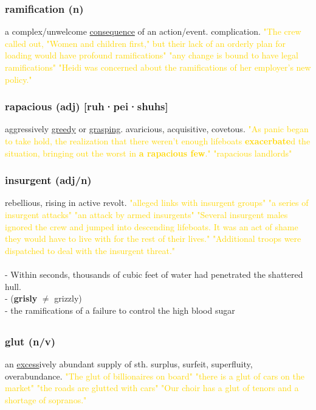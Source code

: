 \documentclass{proc}
\begin{document}
	\subsubsection{\textcolor{brickred}{ramification} (n)}
	a complex/unwelcome \underline{consequence} of an action/event. complication.
	\textcolor{gold}{"The crew called out, "Women and children first," but their lack of an orderly plan for loading would have profound ramifications" "any change is bound to have legal ramifications" "Heidi was concerned about the ramifications of her employer's new policy."}
	
	\subsubsection{\textcolor{brickred}{rapacious} (adj) [ruh·pei·shuhs]}
	aggressively \underline{greedy} or \underline{grasping}. avaricious, acquisitive, covetous.
	\textcolor{gold}{"As panic began to take hold, the realization that there weren't enough lifeboats \textbf{exacerbate}d the situation, bringing out the worst in \textbf{a rapacious few}." "rapacious landlords"}
	
	\subsubsection{\textcolor{brickred}{insurgent} (adj/n)}
	rebellious, rising in active revolt.
	\textcolor{gold}{"alleged links with insurgent groups" "a series of insurgent attacks" "an attack by armed insurgents" "Several insurgent males ignored the crew and jumped into descending lifeboats. It was an act of shame they would have to live with for the rest of their lives." "Additional troops were dispatched to deal with the insurgent threat."}\\\\
	- Within seconds, thousands of cubic feet of water had penetrated the shattered hull.\\
	- (\textbf{grisly} $\neq$ grizzly)\\
	- the ramifications of a failure to control the high blood sugar
	
	\newpage
	\subsection{}
	\subsubsection{\textcolor{brickred}{glut} (n/v)}
	an \underline{excess}ively abundant supply of sth. surplus, surfeit, superfluity, overabundance.
	\textcolor{gold}{"The glut of billionaires on board" "there is a glut of cars on the market" "the roads are glutted with cars" "Our choir has a glut of tenors and a shortage of sopranos."}
	
\end{document}
